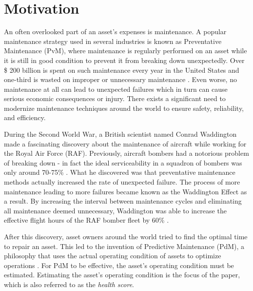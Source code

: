 \section*{Motivation}

An often overlooked part of an asset's expenses is maintenance.
A popular maintenance strategy used in several industries is known as Preventative Maintenance (PvM), 
where maintenance is regularly performed on an asset while it is still in good condition to prevent it from breaking down unexpectedly.
Over \$ 200 billion is spent on such maintenance every year in the United States and one-third is wasted on improper or unnecessary maintenance \cite{mobley2002introduction}.
Even worse, no maintenance at all can lead to unexpected failures which in turn can cause serious economic consequences or injury.
There exists a significant need to modernize maintenance techniques around the world to ensure safety, reliability, and efficiency.

During the Second World War, a British scientist named Conrad Waddington made a fascinating discovery about the maintenance of aircraft while working for the Royal Air Force (RAF).
Previously, aircraft bombers had a notorious problem of breaking down - in fact the ideal serviceability in a squadron of bombers was only around 70-75\% \cite{Morse1364}.
What he discovered was that preventative maintenance methods actually increased the rate of unexpected failure.
The process of more maintenance leading to more failures became known as the Waddington Effect as a result.
By increasing the interval between maintenance cycles and eliminating all maintenance deemed unnecessary,
Waddington was able to increase the effective flight hours of the RAF bomber fleet by 60\% \cite{Morse1364}.

After this discovery, asset owners around the world tried to find the optimal time to repair an asset.
This led to the invention of Predictive Maintenance (PdM), a philosophy that uses the actual operating condition of assets to optimize operations \cite{mobley2002introduction}.
For PdM to be effective, the asset's operating condition must be estimated.
Estimating the asset's operating condition is the focus of the paper, which is also referred to as the \textit{health score}.